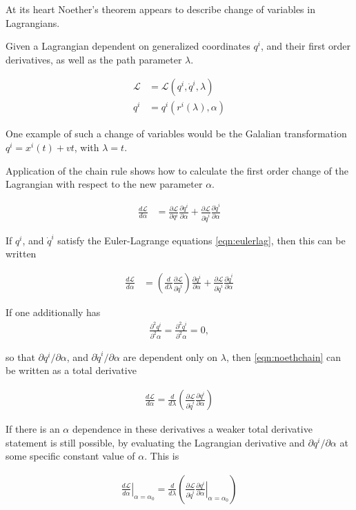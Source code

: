 \documentclass{article}
\newcommand{\LL}[0]{\mathcal{L}}
\newcommand{\qdot}[0]{\dot{q}}
\newcommand{\PD}[2]{\frac{\partial {#2}}{\partial {#1}}}
\newcommand{\PDi}[2]{{\partial {#2}}/{\partial {#1}}}
\newcommand{\PDsq}[2]{\frac{\partial^2 {#2}}{\partial^2 {#1}}}
\begin{document}
At its heart Noether's theorem appears to describe change of variables in
Lagrangians.

Given a Lagrangian dependent on generalized coordinates $q^i$, and their
first order derivatives, as well as the path parameter $\lambda$.

\begin{align*}
\LL &= \LL(q^i, \qdot^i, \lambda) \\
q^i &= q^i(r^i(\lambda), \alpha)
\end{align*}

One 
example of such a change of variables would be the Galalian transformation $q^i = x^i(t) + v t$, with $\lambda = t$.

Application of the chain rule shows how to calculate the first order change
of the Lagrangian with respect to the new parameter $\alpha$.

\begin{align}\label{eqn:nothFirstChain}
\frac{d\LL}{d\alpha}
&=
\PD{q^i}{\LL} \PD{\alpha}{q^i}
+\PD{\qdot^i}{\LL} \PD{\alpha}{\qdot^i}
\end{align}

If $q^i$, and $\qdot^i$ satisfy the Euler-Lagrange equations \ref{eqn:eulerlag}, then this can be written

\begin{align}\label{eqn:noethchain}
\frac{d\LL}{d\alpha}
&=
\left(\frac{d}{d\lambda} \PD{\qdot^i}{\LL}\right)
\PD{\alpha}{q^i}
+\PD{\qdot^i}{\LL} \PD{\alpha}{\qdot^i}
\end{align}

If one additionally has
\begin{align*}
\PDsq{\alpha}{q^i} =\PDsq{\alpha}{\qdot^i} = 0,
\end{align*}

so that $\PDi{\alpha}{q^i}$, and $\PDi{\alpha}{\qdot^i}$ are dependent only
on $\lambda$, then \ref{eqn:noethchain} can be written as a total derivative

\begin{align}\label{eqn:noethTotalDer}
\frac{d\LL}{d\alpha} = \frac{d}{d\lambda} \left( \PD{\qdot^i}{\LL} \PD{\alpha}{q^i} \right)
\end{align}

If there is an $\alpha$ dependence in these derivatives a weaker total derivative statement is still possible, by evaluating the 
Lagrangian derivative and $\PDi{\alpha}{q^i}$ at some specific constant value of $\alpha$.  This is

\begin{align*}
\left.\frac{d\LL}{d\alpha}\right\vert_{\alpha = \alpha_0} = \frac{d}{d\lambda} \left( \PD{\qdot^i}{\LL} \left.\PD{\alpha}{q^i}\right\vert_{\alpha = \alpha_0} \right)
\end{align*}
\end{document}

